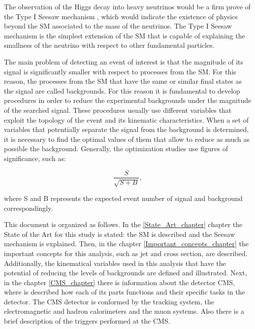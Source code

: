 The observation of the Higgs decay into heavy neutrinos would be a firm prove of the Type I Seesaw mechanism \cite{Type I Seesaw Mechanism}, which would indicate the existence of physics beyond the SM associated to the mass of the neutrinos. The Type I Seesaw mechanism is the simplest extension of the SM that is capable of explaining the smallness of the neutrino with respect to other fundamental particles. 

The main problem of detecting an event of interest is that the magnitude of its signal is significantly smaller with respect to processes from the SM. For this reason, the processes from the SM that have the same or similar final states as the signal are called backgrounds. For this reason it is fundamental to develop procedures in order to reduce the experimental backgrounds under the magnitude of the searched signal. These procedures usually use different variables that exploit the topology of the event and its kinematic characteristics. When a set of variables that potentially separate the signal from the background is determined, it is necessary to find the optimal values of them that allow to reduce as much as possible the background. Generally, the optimization studies use figures of significance, such as: 

\begin{equation}
    \frac{S}{\sqrt{S+B}},
\end{equation}

where S and B represents the expected event number of signal and background correspondingly.

This document is organized as follows. In the \ref{State_Art_chapter} chapter the State of the Art for this study is stated: the SM is described and the Seesaw mechanism is explained. Then, in the chapter \ref{Important_concepts_chapter} the important concepts for this analysis, such as jet and cross section, are described. Additionally, the kinematical variables used in this analysis that have the potential of reducing the levels of backgrounds are defined and illustrated. Next, in the chapter \ref{CMS_chapter} there is information about the detector CMS, where is described how each of its parts functions and their specific tasks in the detector. The CMS detector is conformed by the tracking system, the electromagnetic and hadron calorimeters and the muon systems. Also there is a brief description of the triggers performed at the CMS.
